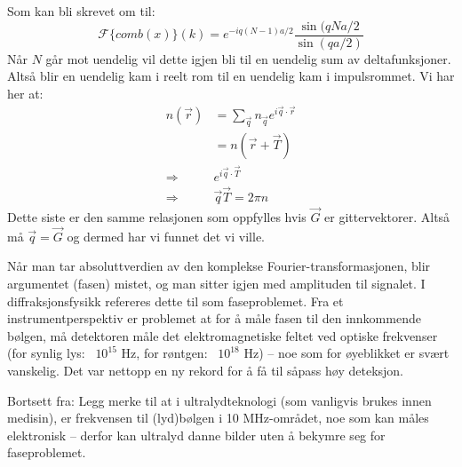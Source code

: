 \documentclass{article}
\begin{document}
Som kan bli skrevet om til:
\begin{equation}
    \mathcal{F}\{comb(x)\}(k) = e^{-iq(N-1)a/2}\frac{\sin(qNa/2}{\sin(qa/2)}
\end{equation}
Når $N$ går mot uendelig vil dette igjen bli til en uendelig sum av deltafunksjoner. Altså blir en uendelig kam i reelt rom til en uendelig kam i impulsrommet.
Vi har her at:
\begin{align}
    n(\vec{r}) &= \sum_{\vec{q}}  n_{\vec{q}}  e^{i\vec{q} \cdot \vec{r}} \\
    &= n(\vec{r} + \vec{T})\\
    \Rightarrow& e^{i \vec{q} \cdot \vec{T}}\\
    \Rightarrow& \vec{q} \vec{T} = 2\pi n
\end{align}
Dette siste er den samme relasjonen som oppfylles hvis $\vec{G}$ er gittervektorer. Altså må $\vec{q} = \vec{G}$ og dermed har vi funnet det vi ville.

Når man tar absoluttverdien av den komplekse Fourier-transformasjonen, blir argumentet (fasen) mistet, og man sitter igjen med amplituden til signalet. I diffraksjonsfysikk refereres dette til som faseproblemet. Fra et instrumentperspektiv er problemet at for å måle fasen til den innkommende bølgen, må detektoren måle det elektromagnetiske feltet ved optiske frekvenser (for synlig lys: ~$10^{15}$ Hz, for røntgen: ~$10^{18}$ Hz) – noe som for øyeblikket er svært vanskelig. Det var nettopp en ny rekord for å få til såpass høy deteksjon.

Bortsett fra: Legg merke til at i ultralydteknologi (som vanligvis brukes innen medisin), er frekvensen til (lyd)bølgen i 10 MHz-området, noe som kan måles elektronisk – derfor kan ultralyd danne bilder uten å bekymre seg for faseproblemet.
\end{document}
